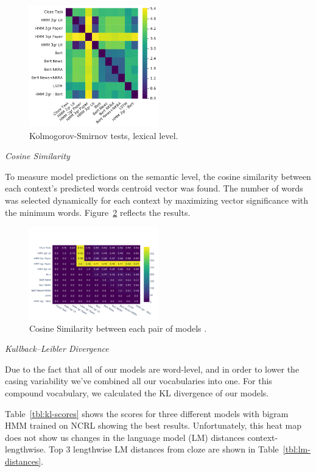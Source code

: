 \documentclass[a4paper]{article}
\newcommand{\head}[1]{\vspace{0.5em}\emph{#1}\vspace{0.25em}}
\begin{document}
\begin{figure}
\caption{Kolmogorov-Smirnov tests, lexical level.}
\label{fig:ks-lexical}
\centering
\includegraphics[width=0.5\textwidth]{figures/pdf/ks-lexical.pdf}
\end{figure}

\head{Cosine Similarity}

To measure model predictions on the semantic level, the cosine similarity between each context’s predicted words centroid vector was found. The number of words was selected dynamically for each context by maximizing vector significance with the minimum words. Figure~\ref{fig:cosine-lexical} reflects the results.
\begin{figure}
\caption{Cosine Similarity between each pair of models .}
\label{fig:cosine-lexical}
\centering
\includegraphics[width=0.5\textwidth]{figures/pdf/cosine-similarity-lexical.pdf}
\end{figure}

\head{Kullback–Leibler Divergence}

Due to the fact that all of our models are word-level, and in order to lower the casing variability we've combined all our vocabularies into one. For this compound vocabulary, we calculated the KL divergence of our models.

Table~\ref{tbl:kl-scores} shows the scores for three different models with
bigram HMM trained on NCRL showing the best results. Unfortunately, this heat map does not show us changes in the language model (LM) distances context-lengthwise. Top 3 lengthwise LM distances from cloze are shown in Table~\ref{tbl:lm-distances}.
\end{document}
